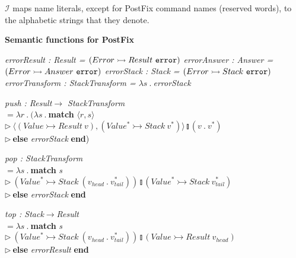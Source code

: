 \documentclass[12pt]{report}
\begin{document}
$\mathcal{I}$ maps name literals, except for PostFix command names (reserved words), to the alphabetic strings that they denote.


{\bf Semantic functions for PostFix}

{\em errorResult : Result = $(Error\rightarrowtail Result\ {\tt error})$} \newline
{\em errorAnswer : Answer = $(Error\rightarrowtail Answer\ {\tt error})$} \newline
{\em errorStack : Stack = $(Error\rightarrowtail Stack\ {\tt error})$} \newline
{\em errorTransform : StackTransform = $\lambda s\:.\:$errorStack} 
\begin{tabbing}
{\em push : Result$\rightarrow$ StackTransform} \\
$=\lambda r\:.\:(\lambda s\:.\:$\={\bf match} $\langle r,s\rangle$\\
\>$\triangleright\ \langle(Value\rightarrowtail Result\ v),(Value^*\rightarrowtail Stack\ v^*)\rangle\talloblong(v\:.\:v^*)$\\
\>$\triangleright\ ${\bf else} {\em errorStack} {\bf end})
\end{tabbing}

\begin{tabbing}
{\em pop : StackTransform} \\
$=\lambda s\:.\:$\={\bf match} {\em s}\\
\>$\triangleright\ (Value^*\rightarrowtail Stack\ (v_{head}\:.\:v^*_{tail}))\talloblong(Value^*\rightarrowtail Stack\ v^*_{tail})$\\
\>$\triangleright\ ${\bf else} {\em errorStack} {\bf end}
\end{tabbing}

\begin{tabbing}
{\em top : Stack$\rightarrow$Result} \\
$=\lambda s\:.\:$\={\bf match} {\em s}\\
\>$\triangleright\ (Value^*\rightarrowtail Stack\ (v_{head}\:.\:v^*_{tail}))\talloblong(Value\rightarrowtail Result\ v_{head})$\\
\>$\triangleright\ ${\bf else} {\em errorResult} {\bf end}
\end{tabbing}
\end{document}
